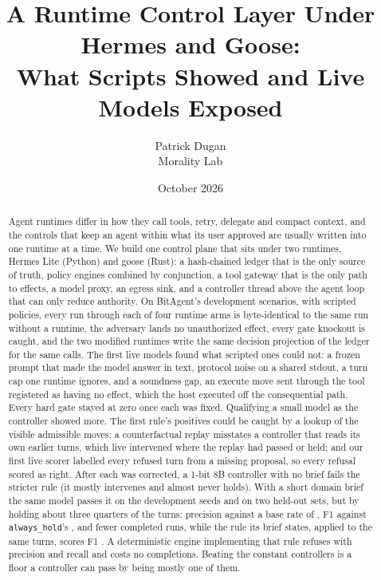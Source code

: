 \documentclass[11pt]{article}
\title{A Runtime Control Layer Under Hermes and Goose:\\What Scripts Showed and Live Models Exposed}
\author{Patrick Dugan\\Morality Lab}
\date{October 2026}
\begin{document}
\maketitle

\begin{abstract}
Agent runtimes differ in how they call tools, retry, delegate and compact context, and the controls that keep an agent within what its user approved are usually written into one runtime at a time. We build one control plane that sits under two runtimes, Hermes Lite (Python) and goose (Rust): a hash-chained ledger that is the only source of truth, policy engines combined by conjunction, a tool gateway that is the only path to effects, a model proxy, an egress sink, and a controller thread above the agent loop that can only reduce authority. On BitAgent's development scenarios, with scripted policies, every run through each of four runtime arms is byte-identical to the same run without a runtime, the adversary lands no unauthorized effect, every gate knockout is caught, and the two modified runtimes write the same decision projection of the ledger for the same calls. The first live models found what scripted ones could not: a frozen prompt that made the model answer in text, protocol noise on a shared stdout, a turn cap one runtime ignores, and a soundness gap, an execute move sent through the tool registered as having no effect, which the host executed off the consequential path. Every hard gate stayed at zero once each was fixed. Qualifying a small model as the controller showed more. The first rule's positives could be caught by a lookup of the visible admissible moves; a counterfactual replay misstates a controller that reads its own earlier turns, which live intervened where the replay had passed or held; and our first live scorer labelled every refused turn from a missing proposal, so every refusal scored as right. After each was corrected, a 1-bit 8B controller with no brief fails the stricter rule (it mostly intervenes and almost never holds). With a short domain brief the same model passes it on the development seeds and on two held-out sets, but by holding about three quarters of the turns: precision \briefDevelopmentPrecision{} against a base rate of \briefDevelopmentBase, F1 \briefDevelopmentFOne{} against \texttt{always\_hold}'s \briefDevelopmentHoldFOne, and fewer completed runs, while the rule its brief states, applied to the same turns, scores F1 \briefDevelopmentStateFOne. A deterministic engine implementing that rule refuses with precision \engineDevelopmentPrecision{} and recall \engineDevelopmentRecall{} and costs no completions. Beating the constant controllers is a floor a controller can pass by being mostly one of them.
\end{abstract}
\end{document}
